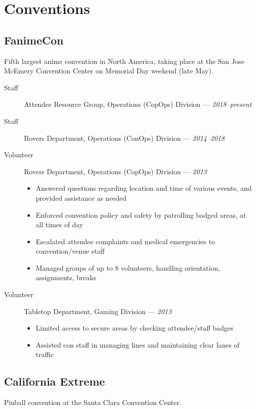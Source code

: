 \documentclass[10pt]{article}
\author{August Valera}
\begin{document}

\section*{Conventions}

\subsection*{FanimeCon}
Fifth largest anime convention in North America, taking place at the San Jose
McEmery Convention Center on Memorial Day weekend (late May).

\begin{description}
  \item[Staff] Attendee Resource Group, Operations (CopOps) Division ---
    \textit{2018--present}
  \item[Staff] Rovers Department, Operations (ConOps) Division ---
    \textit{2014--2018}
  \item[Volunteer] Rovers Department, Operations (CopOps) Division --- \textit{2013}
    \begin{itemize}
      \item Answered questions regarding location and time of various events,
        and provided assistance as needed
      \item Enforced convention policy and safety by patrolling
        badged areas, at all times of day
      \item Escalated attendee complaints and medical emergencies to
        convention/venue staff
      \item Managed groups of up to $8$ volunteers, handling orientation,
        assignments, breaks
    \end{itemize}
  \item[Volunteer] Tabletop Department, Gaming Division --- \textit{2013}
    \begin{itemize}
      \item Limited access to secure areas by checking attendee/staff badges
      \item Assisted con staff in managing lines and maintaining clear lanes of
        traffic
    \end{itemize}
\end{description}

\subsection*{California Extreme}
Pinball convention at the Santa Clara Convention Center.
\end{document}
